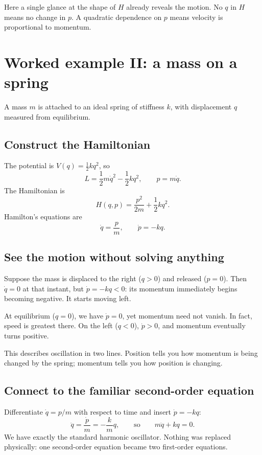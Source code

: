 \documentclass[11pt,a4paper,oneside]{article}
\begin{document}
\begin{intuition}
Here a single glance at the shape of $H$ already reveals the motion. No $q$ in $H$ means no change in $p$. A quadratic dependence on $p$ means velocity is proportional to momentum.
\end{intuition}

\section{Worked example II: a mass on a spring}
A mass $m$ is attached to an ideal spring of stiffness $k$, with displacement $q$ measured from equilibrium.

\subsection{Construct the Hamiltonian}
The potential is $V(q)=\tfrac12kq^2$, so
\[
 L=\frac12m\dot q^2-\frac12kq^2,\qquad
 p=m\dot q.
\]
The Hamiltonian is
\begin{equation}\label{eq:springH}
 \boxed{H(q,p)=\frac{p^2}{2m}+\frac12kq^2.}
\end{equation}
Hamilton's equations are
\begin{equation}\label{eq:springpair}
 \boxed{\dot q=\frac{p}{m},\qquad\dot p=-kq.}
\end{equation}

\subsection{See the motion without solving anything}
Suppose the mass is displaced to the right ($q>0$) and released ($p=0$). Then $\dot q=0$ at that instant, but $\dot p=-kq<0$: its momentum immediately begins becoming negative. It starts moving left.

At equilibrium ($q=0$), we have $\dot p=0$, yet momentum need not vanish. In fact, speed is greatest there. On the left ($q<0$), $\dot p>0$, and momentum eventually turns positive.

This describes oscillation in two lines. Position tells you how momentum is being changed by the spring; momentum tells you how position is changing.

\subsection{Connect to the familiar second-order equation}
Differentiate $\dot q=p/m$ with respect to time and insert $\dot p=-kq$:
\[
 \ddot q=\frac{\dot p}{m}=-\frac{k}{m}q,
\qquad\text{so}\qquad m\ddot q+kq=0.
\]
We have exactly the standard harmonic oscillator. Nothing was replaced physically: one second-order equation became two first-order equations.
\end{document}
